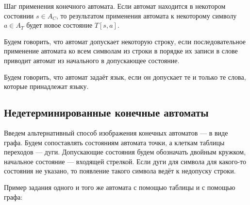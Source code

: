 \documentclass[12pt,a4paper,oneside]{article}
\begin{document}
\begin{definition}
Шаг применения конечного автомата. Если автомат находится в некотором состоянии
$s \in A_C$, то результатом применения автомата к некоторому символу $a \in A_T$
будет новое состояние $T[s,a]$.
\end{definition}

\begin{definition}
Будем говорить, что автомат допускает некоторую строку, если последовательное применение
автомата ко всем символам из строки в порядке их записи в слове приводит автомат
из начального в допускающее состояние.
\end{definition}

\begin{definition}
Будем говорить, что автомат задаёт язык, если он допускает те и только те слова, которые
принадлежат языку.
\end{definition}

\subsection{Недетерминированные конечные автоматы}

Введем альтернативный способ изображения конечных автоматов --- в виде графа.
Будем сопоставлять состояниям автомата точки, а клеткам таблицы переходов --- дуги.
Допускающие состояния будем обозначать двойным кружком, начальное состояние --- входящей стрелкой.
Если дуги для символа для какого-то состояния не указано, то появление такого символа ведёт к недопуску 
строки.

Пример задания одного и того же автомата с помощью таблицы и с помощью графа:
\vspace{3mm}
\end{document}

